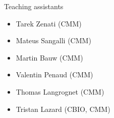 \documentclass[xcolor=pdftex,dvipsnames,table,mathserif]{beamer}
\begin{document}
\begin{frame}{Teaching assistants}


      \begin{itemize}
        \item Tarek Zenati (CMM)
      \item Mateus Sangalli (CMM)
      \item Martin Bauw (CMM)
      \item Valentin Penaud (CMM)
      \item Thomas Langrognet (CMM)
      \item Tristan Lazard (CBIO, CMM)
      \end{itemize}

\end{frame}









\end{document}
